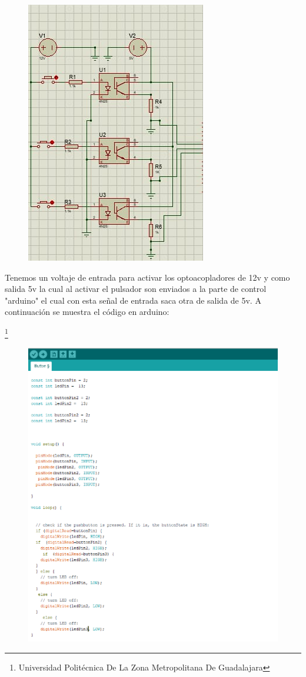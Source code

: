 \documentclass[11pt,a4paper]{article}
\begin{document}
\begin{figure}[hbtp]
\centering
\includegraphics[scale=0.80]{entrada.png}
\end{figure}

Tenemos un voltaje de entrada para activar los optoacopladores de 12v y como salida 5v la cual al activar el pulsador son enviados a la parte de control "arduino" el cual con esta señal de entrada saca otra de salida de 5v. A continuación se muestra el código en arduino:

\footnote{Universidad Politécnica De La Zona Metropolitana De Guadalajara} 

\newpage


\begin{figure}[hbtp]
\centering
\includegraphics[scale=0.80]{codigo.png}
\end{figure}
\end{document}
